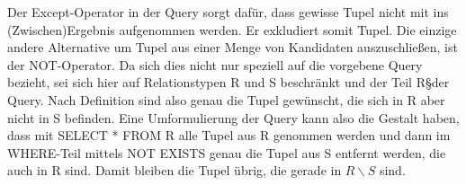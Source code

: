 \documentclass[12pt,a4paper]{amsart}
\begin{document}
\begin{aufgabe1}

Der Except-Operator in der Query sorgt dafür, dass gewisse Tupel nicht mit ins (Zwischen)Ergebnis aufgenommen werden. Er exkludiert somit Tupel. Die einzige andere Alternative um Tupel aus einer Menge von Kandidaten auszuschließen, ist der NOT-Operator. Da sich dies nicht nur speziell auf die vorgebene Query bezieht, sei sich hier auf Relationstypen R und S beschränkt und der Teil R\S der Query. Nach Definition sind also genau die Tupel gewünscht, die sich in R aber nicht in S befinden.
Eine Umformulierung der Query kann also die Gestalt haben, dass mit SELECT * FROM R alle Tupel aus R genommen werden und dann im WHERE-Teil mittels NOT EXISTS genau die Tupel aus S entfernt werden, die auch in R sind. Damit bleiben die Tupel übrig, die gerade in $R \backslash S$ sind.

\end{aufgabe1}
\end{document}
